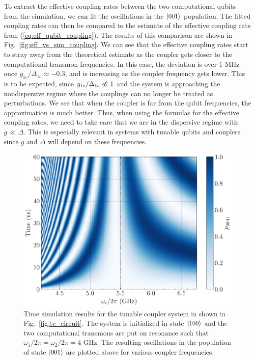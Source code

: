 To extract the effective coupling rates between the two computational qubits from the simulation, we can fit the oscillations in the $\ket{001}$ population. The fitted coupling rates can then be compared to the estimate of the effective coupling rate from (\ref{eq:eff_qubit_coupling}). The results of this comparison are shown in Fig.\ \ref{fig:eff_vs_sim_coupling}. We can see that the effective coupling rates start to stray away from the theoretical estimate as the coupler gets closer to the computational transmon frequencies. In this case, the deviation is over 1 MHz once $g_{1c}/\Delta_{1c} \approx  -0.3$, and is increasing as the coupler frequency gets lower. This is to be expected, since $g_{1c}/\Delta_{1c} \centernot{\ll} 1$ and the system is approaching the nondispersive regime where the couplings can no longer be treated as perturbations. We see that when the coupler is far from the qubit frequencies, the approximation is much better. Thus, when using the formulas for the effective coupling rates, we need to take care that we are in the dispersive regime with $g \ll \Delta$. This is especially relevant in systems with tunable qubits and couplers since $g$ and $\Delta$ will depend on these frequencies. 

\begin{figure}[!h]
    \centering
    \includegraphics[width=.75\textwidth]{figures/TC_time_evolution.pdf}
    \caption{Time simulation results for the tunable coupler system in shown in Fig.\ \ref{fig:tc_circuit}. The system is initialized in state $\ket{100}$ and the two computational transmons are put on resonance such that $\omega_1/2\pi=\omega_2/2\pi=4$ GHz. The resulting oscillations in the population of state $\ket{001}$ are plotted above for various coupler frequencies.}
    \label{fig:tc_time_evolution}
\end{figure}

